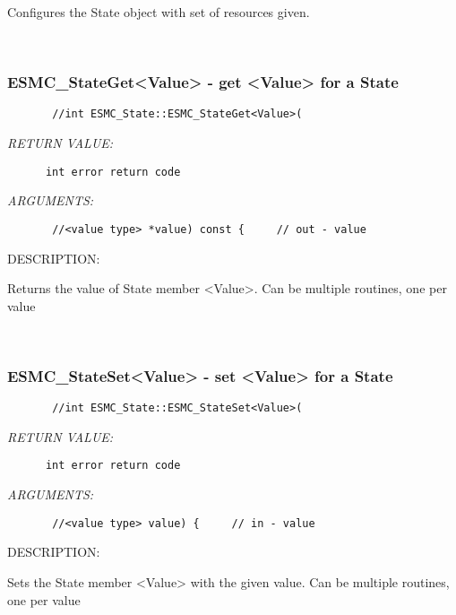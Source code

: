       Configures the State object with set of resources given.
   
 
\mbox{}\hrulefill\ 
 
\subsubsection{ESMC\_StateGet<Value> - get <Value> for a State}


  
\begin{verbatim}       //int ESMC_State::ESMC_StateGet<Value>(\end{verbatim}{\em RETURN VALUE:}
\begin{verbatim}      int error return code\end{verbatim}{\em ARGUMENTS:}
\begin{verbatim}       //<value type> *value) const {     // out - value\end{verbatim}
{\sf DESCRIPTION:\\ }


       Returns the value of State member <Value>.
       Can be multiple routines, one per value
   
 
\mbox{}\hrulefill\ 
 
\subsubsection{ESMC\_StateSet<Value> - set <Value> for a State}


  
\begin{verbatim}       //int ESMC_State::ESMC_StateSet<Value>(\end{verbatim}{\em RETURN VALUE:}
\begin{verbatim}      int error return code\end{verbatim}{\em ARGUMENTS:}
\begin{verbatim}       //<value type> value) {     // in - value\end{verbatim}
{\sf DESCRIPTION:\\ }


       Sets the State member <Value> with the given value.
       Can be multiple routines, one per value
   
 
